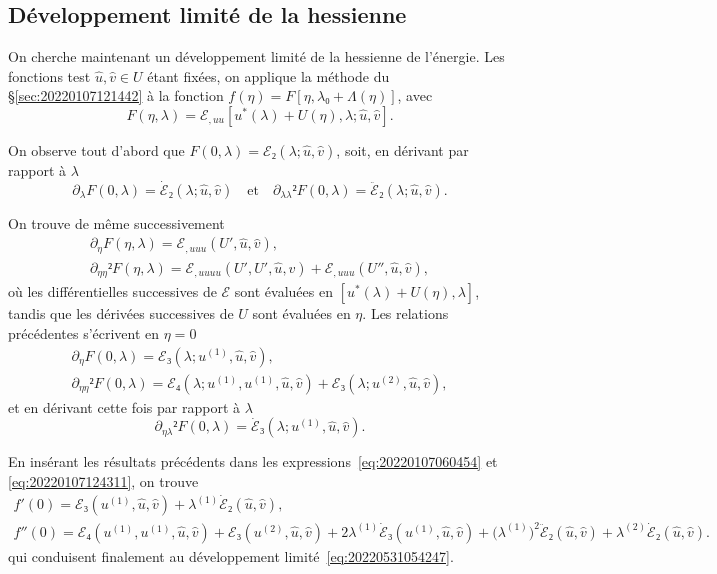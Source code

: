 \documentclass[12pt, final]{scrartcl}
\theoremstyle{definition}
\newcommand{\order}[2][1]{#2^{(#1)}}
\begin{document}
\subsection{Développement limité de la hessienne}
\label{sec:20220616055207}
%

On cherche maintenant un développement limité de la hessienne de l'énergie. Les
fonctions test \(\hat{u}, \hat{v} ∈ U\) étant fixées, on applique la méthode du
\S\ref{sec:20220107121442} à la fonction \(f(η) = F [η, λ₀ + Λ(η)]\), avec
\begin{equation*}
  F(η, λ) = ℰ_{, u u} [u^{\ast}(λ) + U(η), λ; \hat{u}, \hat{v}].
\end{equation*}

On observe tout d'abord que \(F(0, λ) =ℰ₂(λ; \hat{u}, \hat{v})\), soit, en
dérivant par rapport à \(λ\)
\begin{equation*}
  ∂_{λ} F(0, λ) = \dot{ℰ}₂(λ; \hat{u}, \hat{v})
  \quad \text{et} \quad
  ∂_{λλ}² F(0, λ) = \ddot{ℰ}₂(λ; \hat{u}, \hat{v}).
\end{equation*}

On trouve de même successivement
\begin{gather*}
  ∂_{η} F(η, λ) = ℰ_{, uuu}(U', \hat{u}, \hat{v}),\\
  ∂_{ηη}² F(η, λ) = ℰ_{, uuuu}(U', U', \hat{u}, \hat{v}) + ℰ_{, uuu}(U'', \hat{u}, \hat{v}),
\end{gather*}
où les différentielles successives de \(ℰ\) sont évaluées en
\([u^{\ast}(λ) + U(η), λ]\), tandis que les dérivées successives de \(U\) sont
évaluées en \(η\). Les relations précédentes s'écrivent en \(η = 0\)
\begin{gather*}
  ∂_{η} F(0, λ) = ℰ₃(λ; \order[1]u, \hat{u}, \hat{v}),\\
  ∂_{ηη}² F(0, λ) = ℰ₄(λ ; \order[1]u, \order[1]u, \hat{u}, \hat{v}) + ℰ₃(λ; \order[2]u, \hat{u}, \hat{v}),
\end{gather*}
et en dérivant cette fois par rapport à \(λ\)
\begin{equation*}
  ∂_{η λ}² F(0, λ) = \dot{ℰ}₃(λ; \order[1]u, \hat{u}, \hat{v}).
\end{equation*}

En insérant les résultats précédents dans les
expressions~\eqref{eq:20220107060454} et \eqref{eq:20220107124311}, on trouve
\begin{gather*}
  f'(0) = ℰ₃(\order[1]u, \hat{u}, \hat{v}) + \order[1]λ \dot{ℰ}₂(\hat{u}, \hat{v}),\\
  f''(0) = ℰ₄(\order[1]u, \order[1]u, \hat{u}, \hat{v}) + ℰ₃(\order[2]u, \hat{u}, \hat{v}) + 2\order[1]λ \dot{ℰ}₃(\order[1]u, \hat{u}, \hat{v}) + \bigl( \order[1]λ \bigr)^2 \ddot{ℰ}₂(\hat{u}, \hat{v}) + \order[2]λ \dot{ℰ}₂(\hat{u}, \hat{v}) .
\end{gather*}
qui conduisent finalement au développement limité~\eqref{eq:20220531054247}.
\end{document}
